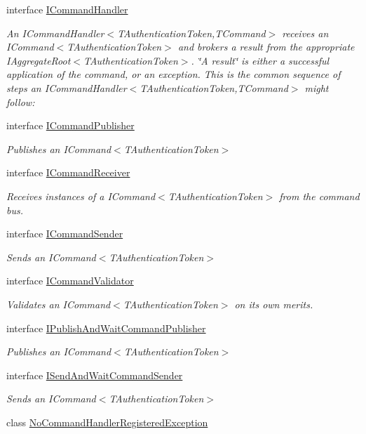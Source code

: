 \begin{DoxyCompactItemize}
interface \hyperlink{interfaceCqrs_1_1Commands_1_1ICommandHandler}{I\+Command\+Handler}
\begin{DoxyCompactList}\small\item\em An I\+Command\+Handler$<$\+T\+Authentication\+Token,\+T\+Command$>$ receives an I\+Command$<$\+T\+Authentication\+Token$>$ and brokers a result from the appropriate I\+Aggregate\+Root$<$\+T\+Authentication\+Token$>$. \char`\"{}\+A result\char`\"{} is either a successful application of the command, or an exception. This is the common sequence of steps an I\+Command\+Handler$<$\+T\+Authentication\+Token,\+T\+Command$>$ might follow\+: \end{DoxyCompactList}\item 
interface \hyperlink{interfaceCqrs_1_1Commands_1_1ICommandPublisher}{I\+Command\+Publisher}
\begin{DoxyCompactList}\small\item\em Publishes an I\+Command$<$\+T\+Authentication\+Token$>$ \end{DoxyCompactList}\item 
interface \hyperlink{interfaceCqrs_1_1Commands_1_1ICommandReceiver}{I\+Command\+Receiver}
\begin{DoxyCompactList}\small\item\em Receives instances of a I\+Command$<$\+T\+Authentication\+Token$>$ from the command bus. \end{DoxyCompactList}\item 
interface \hyperlink{interfaceCqrs_1_1Commands_1_1ICommandSender}{I\+Command\+Sender}
\begin{DoxyCompactList}\small\item\em Sends an I\+Command$<$\+T\+Authentication\+Token$>$ \end{DoxyCompactList}\item 
interface \hyperlink{interfaceCqrs_1_1Commands_1_1ICommandValidator}{I\+Command\+Validator}
\begin{DoxyCompactList}\small\item\em Validates an I\+Command$<$\+T\+Authentication\+Token$>$ on its own merits. \end{DoxyCompactList}\item 
interface \hyperlink{interfaceCqrs_1_1Commands_1_1IPublishAndWaitCommandPublisher}{I\+Publish\+And\+Wait\+Command\+Publisher}
\begin{DoxyCompactList}\small\item\em Publishes an I\+Command$<$\+T\+Authentication\+Token$>$ \end{DoxyCompactList}\item 
interface \hyperlink{interfaceCqrs_1_1Commands_1_1ISendAndWaitCommandSender}{I\+Send\+And\+Wait\+Command\+Sender}
\begin{DoxyCompactList}\small\item\em Sends an I\+Command$<$\+T\+Authentication\+Token$>$ \end{DoxyCompactList}\item 
class \hyperlink{classCqrs_1_1Commands_1_1NoCommandHandlerRegisteredException}{No\+Command\+Handler\+Registered\+Exception}
\end{DoxyCompactItemize}
